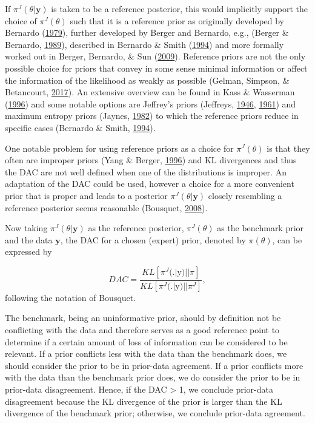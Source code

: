 \documentclass[openright,titlepage,12pt,a4paper]{book}
\begin{document}
If \(\pi^J(\theta|\textbf{y})\) is taken to be a reference posterior, this would implicitly support the choice of \(\pi^J(\theta)\) such that it is a reference prior as originally developed by Bernardo (\protect\hyperlink{ref-bernardo_reference_1979}{1979}), further developed by Berger and Bernardo, e.g., (Berger \& Bernardo, \protect\hyperlink{ref-berger_estimating_1989}{1989}), described in Bernardo \& Smith (\protect\hyperlink{ref-bernardo_bayesian_1994}{1994}) and more formally worked out in Berger, Bernardo, \& Sun (\protect\hyperlink{ref-berger_formal_2009}{2009}). Reference priors are not the only possible choice for priors that convey in some sense minimal information or affect the information of the likelihood as weakly as possible (Gelman, Simpson, \& Betancourt, \protect\hyperlink{ref-gelman_prior_2017}{2017}). An extensive overview can be found in Kass \& Wasserman (\protect\hyperlink{ref-kass_selection_1996}{1996}) and some notable options are
Jeffrey's priors (Jeffreys, \protect\hyperlink{ref-jeffreys_invariant_1946}{1946}, \protect\hyperlink{ref-jeffreys_theory_1961}{1961}) and maximum entropy priors (Jaynes, \protect\hyperlink{ref-jaynes_rationale_1982}{1982}) to which the reference priors reduce in specific cases (Bernardo \& Smith, \protect\hyperlink{ref-bernardo_bayesian_1994}{1994}).

One notable problem for using reference priors as a choice for \(\pi^J(\theta)\) is that they often are improper priors (Yang \& Berger, \protect\hyperlink{ref-yang_catalog_1996}{1996}) and KL divergences and thus the DAC are not well defined when one of the distributions is improper. An adaptation of the DAC could be used, however a choice for a more convenient prior that is proper and leads to a posterior \(\pi^J(\theta|\textbf{y})\) closely resembling a reference posterior seems reasonable (Bousquet, \protect\hyperlink{ref-bousquet_diagnostics_2008}{2008}).

Now taking \(\pi^J(\theta|\textbf{y})\) as the reference posterior, \(\pi^J(\theta)\) as the benchmark prior and the data \(\textbf{y}\), the DAC for a chosen (expert) prior, denoted by \(\pi(\theta)\), can be expressed by

\begin{equation} 
DAC = \frac{KL[\pi^J(.|\textrm{y})||\pi]}{KL[\pi^J(.|\textrm{y})||\pi^J]},
\label{eq:ch03eq2}
\end{equation}
following the notation of Bousquet.

The benchmark, being an uninformative prior, should by definition not be conflicting with the data and therefore serves as a good reference point to determine if a certain amount of loss of information can be considered to be relevant. If a prior conflicts less with the data than the benchmark does, we should consider the prior to be in prior-data agreement. If a prior conflicts more with the data than the benchmark prior does, we do consider the prior to be in prior-data disagreement. Hence, if the DAC \textgreater{} 1, we conclude prior-data disagreement because the KL divergence of the prior is larger than the KL divergence of the benchmark prior; otherwise, we conclude prior-data agreement.
\end{document}
